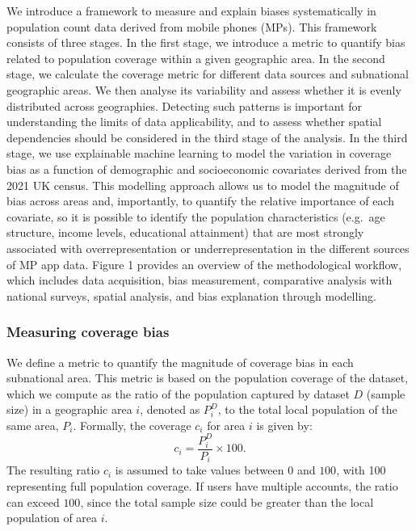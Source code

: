 \documentclass[]{rsos}%
\begin{document}
We introduce a framework to measure and explain biases systematically in
population count data derived from mobile phones (MPs). This framework
consists of three stages. In the first stage, we introduce a metric to
quantify bias related to population coverage within a given geographic
area. In the second stage, we calculate the coverage metric for
different data sources and subnational geographic areas. We then analyse
its variability and assess whether it is evenly distributed across
geographies. Detecting such patterns is important for understanding the
limits of data applicability, and to assess whether spatial dependencies
should be considered in the third stage of the analysis. In the third
stage, we use explainable machine learning to model the variation in
coverage bias as a function of demographic and socioeconomic covariates
derived from the 2021 UK census. This modelling approach allows us to
model the magnitude of bias across areas and, importantly, to quantify
the relative importance of each covariate, so it is possible to identify
the population characteristics (e.g.~age structure, income levels,
educational attainment) that are most strongly associated with
overrepresentation or underrepresentation in the different sources of MP
app data. Figure 1 provides an overview of the methodological workflow,
which includes data acquisition, bias measurement, comparative analysis
with national surveys, spatial analysis, and bias explanation through
modelling.

\subsubsection{Measuring coverage bias}\label{measuring-coverage-bias}

We define a metric to quantify the magnitude of coverage bias in each
subnational area. This metric is based on the population coverage of the
dataset, which we compute as the ratio of the population captured by
dataset \(D\) (sample size) in a geographic area \(i\), denoted as \(P_i^D\),
to the total local population of the same area, \(P_i\). Formally, the
coverage \(c_i\) for area \(i\) is given by: \begin{equation}
c_i = \dfrac{P_i^D}{P_i} \times 100.
\end{equation} The resulting ratio \(c_i\) is assumed to take values
between \(0\) and \(100\), with 100 representing full population coverage.
If users have multiple accounts, the ratio can exceed \(100\), since the
total sample size could be greater than the local population of area
\(i\).
\end{document}
